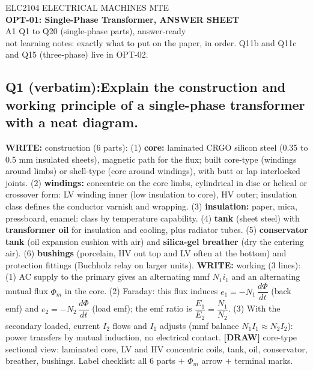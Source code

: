 \documentclass[11pt]{article}
\newcommand{\q}[2]{\subsection*{\color{copper}#1\quad\color{iron}#2}}
\newcommand{\w}[1]{\textbf{\color{copper}WRITE:} #1}
\newcommand{\dw}[1]{\textbf{\color{muted}[DRAW]} #1}
\begin{document}
\begin{center}
{\footnotesize\color{copper} ELC2104 \textbar{} ELECTRICAL MACHINES \textbar{} MTE}\\[6pt]
{\LARGE\bfseries\color{iron} OPT-01: Single-Phase Transformer, ANSWER SHEET}\\[2pt]
{\Large\color{copper} A1 Q1 to Q20 (single-phase parts), answer-ready}\\[6pt]
{\footnotesize\color{muted} not learning notes: exactly what to put on the paper, in order. Q11b and Q11c and Q15 (three-phase) live in OPT-02.}
\end{center}

\hrulefill
\q{Q1 (verbatim):}{Explain the construction and working principle of a single-phase transformer with a neat diagram.}
\w{construction (6 parts):} (1) \textbf{core:} laminated CRGO silicon steel (0.35 to 0.5 mm insulated sheets), magnetic path for the flux; built core-type (windings around limbs) or shell-type (core around windings), with butt or lap interlocked joints. (2) \textbf{windings:} concentric on the core limbs, cylindrical in disc or helical or crossover form: LV winding inner (low insulation to core), HV outer; insulation class defines the conductor varnish and wrapping. (3) \textbf{insulation:} paper, mica, pressboard, enamel: class by temperature capability. (4) \textbf{tank} (sheet steel) with \textbf{transformer oil} for insulation and cooling, plus radiator tubes. (5) \textbf{conservator tank} (oil expansion cushion with air) and \textbf{silica-gel breather} (dry the entering air). (6) \textbf{bushings} (porcelain, HV out top and LV often at the bottom) and protection fittings (Buchholz relay on larger units).
\w{working (3 lines):} (1) AC supply to the primary gives an alternating mmf $N_1 i_1$ and an alternating mutual flux $\Phi_m$ in the core. (2) Faraday: this flux induces $e_1 = -N_1\,\dfrac{d\Phi}{dt}$ (back emf) and $e_2 = -N_2\,\dfrac{d\Phi}{dt}$ (load emf); the emf ratio is $\dfrac{E_1}{E_2} = \dfrac{N_1}{N_2}$. (3) With the secondary loaded, current $I_2$ flows and $I_1$ adjusts (mmf balance $N_1 I_1 \approx N_2 I_2$): power transfers by mutual induction, no electrical contact.
\dw{core-type sectional view: laminated core, LV and HV concentric coils, tank, oil, conservator, breather, bushings. Label checklist: all 6 parts + $\Phi_m$ arrow + terminal marks.}
\end{document}
